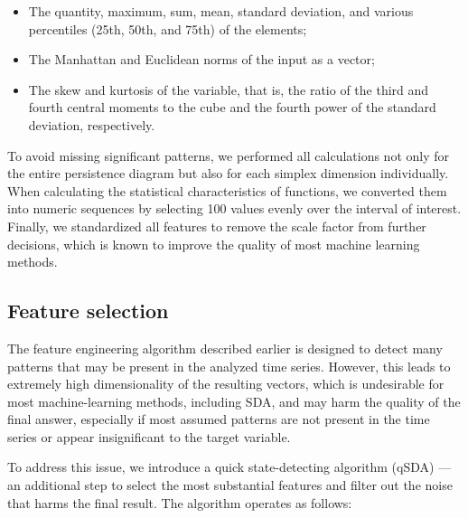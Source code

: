 \documentclass[10pt,lettersize,journal]{IEEEtran}
\begin{document}
\begin{itemize}
    \item 
        The quantity, maximum, sum, mean, standard deviation, and various percentiles (25th, 50th, and 75th) of the elements;
    \item 
        The Manhattan and Euclidean norms of the input as a vector;
    \item 
        The skew and kurtosis of the variable, that is, the ratio of the third and fourth central moments to the cube and the fourth power of the standard deviation, respectively.
\end{itemize}

To avoid missing significant patterns, we performed all calculations not only for the entire persistence diagram but also for each simplex dimension individually. When calculating the statistical characteristics of functions, we converted them into numeric sequences by selecting 100 values evenly over the interval of interest. Finally, we standardized all features to remove the scale factor from further decisions, which is known to improve the quality of most machine learning methods.

\subsection{Feature selection}

The feature engineering algorithm described earlier is designed to detect many patterns that may be present in the analyzed time series. However, this leads to extremely high dimensionality of the resulting vectors, which is undesirable for most machine-learning methods, including SDA, and may harm the quality of the final answer, especially if most assumed patterns are not present in the time series or appear insignificant to the target variable.

To address this issue, we introduce a quick state-detecting algorithm (qSDA) --- an additional step to select the most substantial features and filter out the noise that harms the final result. The algorithm operates as follows:
\end{document}

